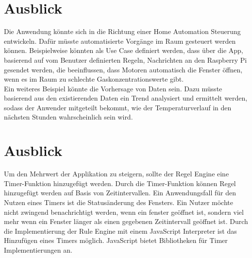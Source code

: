 \chapter{Ausblick}


Die Anwendung könnte sich in die Richtung einer Home Automation Steuerung entwickeln. Dafür müsste automatisierte Vorgänge im Raum gesteuert werden können. Beispielweise könnten als Use Case definiert werden, dass über die App, basierend auf vom Benutzer definierten Regeln, Nachrichten an den Raspberry Pi gesendet werden, die beeinflussen, dass Motoren automatisch die Fenster öffnen, wenn es im Raum zu schlechte Gaskonzentrationswerte gibt.  
\\Ein weiteres Beispiel könnte die Vorhersage von Daten sein. Dazu müsste basierend aus den existierenden Daten ein Trend analysiert und ermittelt werden, sodass der Anwender mitgeteilt bekommt, wie der Temperaturverlauf in den nächsten Stunden wahrscheinlich sein wird.
\chapter{Ausblick}
Um den Mehrwert der Applikation zu steigern, sollte der Regel Engine eine Timer-Funktion hinzugefügt werden. Durch die Timer-Funktion können Regel hinzugefügt werden auf Basis von Zeitintervallen. Ein Anwendungsfall für den Nutzen eines Timers ist die Statusänderung des Fensters. Ein Nutzer möchte nicht zwingend benachrichtigt werden, wenn ein fenster geöffnet ist, sondern viel mehr wenn ein Fenster länger als einen gegebenen Zeitintervall geöffnet ist. Durch die Implementierung der Rule Engine mit einem JavaScript Interpreter ist das Hinzufügen eines Timers möglich. JavaScript bietet Bibliotheken für Timer Implementierungen an.\\

